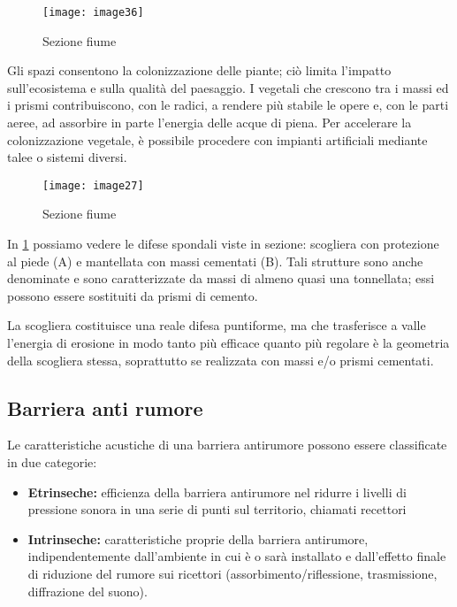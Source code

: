 \begin{figure}[H]
	\centering
	\texttt{[image: image36]}
	\caption{Sezione fiume}
	\label{fig:spnde}
\end{figure}

\noindent
Gli spazi consentono la colonizzazione delle piante; ciò limita l’impatto sull'ecosistema e sulla qualità del paesaggio. I vegetali che crescono tra i massi ed i prismi contribuiscono, con le radici, a rendere più stabile le opere e, con le parti aeree, ad assorbire in parte l’energia delle acque di piena. Per accelerare la colonizzazione vegetale, è possibile procedere con impianti artificiali mediante talee o sistemi diversi. \\

\begin{wrapfigure}[14]{r}{0.4\textwidth}
	\centering
	\texttt{[image: image27]}
	\caption{Sezione fiume}
\end{wrapfigure}

In \cref{fig:spnde} possiamo vedere le difese spondali viste in sezione: scogliera con protezione al piede (A) e mantellata con massi cementati (B). Tali strutture sono anche denominate  e sono caratterizzate da massi di almeno quasi una tonnellata; essi possono essere sostituiti da prismi di cemento. 


La scogliera costituisce una reale difesa puntiforme, ma che trasferisce a valle l’energia di erosione in modo tanto più efficace quanto più regolare è la geometria della scogliera stessa, soprattutto se realizzata con massi e/o prismi cementati.

\subsection{Barriera anti rumore}

Le caratteristiche acustiche di una barriera antirumore possono essere classificate in due categorie: 
\begin{itemize}
	\item \textbf{Etrinseche:} efficienza della barriera antirumore nel ridurre i livelli di pressione sonora in una serie di punti sul territorio, chiamati recettori
	\item \textbf{Intrinseche:} caratteristiche proprie della barriera antirumore, indipendentemente dall'ambiente in cui è o sarà installato e dall'effetto finale di riduzione del rumore sui ricettori (assorbimento/riflessione, trasmissione, diffrazione del suono).
\end{itemize}

